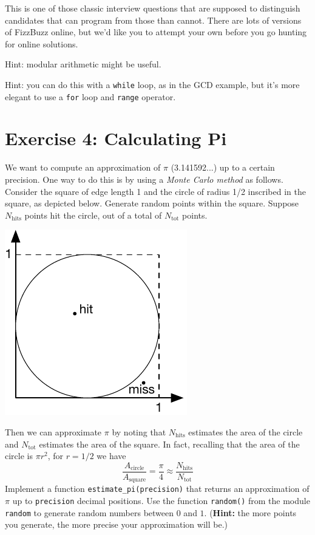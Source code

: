 \documentclass{article}
\begin{document}
This is one of those classic interview questions that are supposed to
distinguish candidates that can program from those than cannot.  There
are lots of versions of FizzBuzz online, but we'd like you to attempt
your own before you go hunting for online solutions.

\vspace{0.1in}\noindent Hint: modular arithmetic might be useful.

\vspace{0.1in}\noindent Hint: you can do this with a \texttt{while} loop, as in the GCD example, but it's
more elegant to use a \texttt{for} loop and \texttt{range} operator.

\newpage
\section*{Exercise 4: Calculating Pi}

We want to compute an approximation of $\pi$ (3.141592...) up to a
 certain precision. One way to do this is by using a \emph{Monte Carlo
 method} as follows. Consider the square of edge length 1 and the
 circle of radius 1/2 inscribed in the square, as depicted
 below. Generate random points within the square. Suppose
 $N_{\text{hits}}$ points hit the circle, out of a total of
 $N_{\text{tot}}$ points.


\begin{center}
\includegraphics{ex1}
\end{center}

Then we can approximate $\pi$ by noting that $N_{\text{hits}}$
 estimates the area of the circle and $N_{\text{tot}}$ estimates the
 area of the square. In fact, recalling that the area of the circle is
 $\pi r^2$, for $r=1/2$ we have
\[
	\frac{A_{\text{circle}}}{A_{\text{square}}} = \frac{\pi}{4} \approx \frac{N_{\text{hits}}}{N_{\text{tot}}}
\]
%
Implement a function \texttt{estimate\_pi(precision)} that returns an
 approximation of $\pi$ up to \texttt{precision} decimal
 positions. Use the function \texttt{random()} from the module
 \texttt{random} to generate random numbers between $0$ and
 $1$. (\textbf{Hint:} the more points you generate, the more precise
 your approximation will be.)
\end{document}
